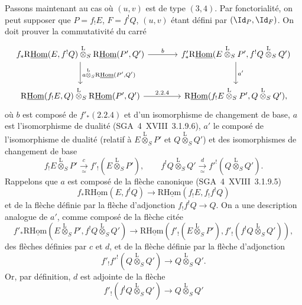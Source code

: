 Passons maintenant au cas où $(u,v)$ est de type $(3,4)$. Par fonctorialité, on peut supposer que $P=f_{!}E$, $F=f^{!}Q$, $(u,v)$ étant défini par $(\Id_P,\Id_F)$. On doit prouver la commutativité du carré
\[
\begin{tikzcd}[
column sep=large,row sep=large]
f_*\mathrm{R}\underline{\mathrm{Hom}}(E,f^!Q)\overset{\mathrm{L}}{\otimes}_S\mathrm{R}\underline{\mathrm{Hom}}(P',Q') \arrow[r,"b"] \arrow[d,"{a\overset{\mathrm{L}}{\otimes}_S\mathrm{R}\underline{\mathrm{Hom}}(P',Q')}"] & f'_*\mathrm{R}\underline{\mathrm{Hom}}(E\overset{\mathrm{L}}{\otimes}_SP',f^!Q\overset{\mathrm{L}}{\otimes}_SQ') \arrow[d,"a'"]\\
\mathrm{R}\underline{\mathrm{Hom}}(f_!E,Q)\overset{\mathrm{L}}{\otimes}_S\mathrm{R}\underline{\mathrm{Hom}}(P',Q') \arrow[r,"2.2.4"] & \mathrm{R}\underline{\mathrm{Hom}}(f_!E\overset{\mathrm{L}}{\otimes}_SP',Q\overset{\mathrm{L}}{\otimes}_SQ'),
\end{tikzcd}
\]
où $b$ est composé de $f'_*(2.2.4)$ et d'un isomorphisme de changement de base, $a$ est l'isomorphisme de dualité (SGA~4~XVIII~3.1.9.6), $a'$ le composé de l'isomorphisme de dualité (relatif à $E\overset{\mathrm{L}}{\otimes}_SP'$ et $Q\overset{\mathrm{L}}{\otimes}_SQ'$) et des isomorphismes de changement de base
\[
f_!E\overset{\mathrm{L}}{\otimes}_SP'\xrightarrow[\simeq]{c}f'_!(E\overset{\mathrm{L}}{\otimes}_SP'),
\qquad
f^!Q\overset{\mathrm{L}}{\otimes}_SQ'\xrightarrow[\simeq]{d}f'^!(Q\overset{\mathrm{L}}{\otimes}_SQ').
\]
Rappelons que $a$ est composé de la flèche canonique (SGA~4~XVIII~3.1.9.5)
\[
f_*\mathrm{R}\underline{\mathrm{Hom}}(E,f^!Q)\longrightarrow\mathrm{R}\underline{\mathrm{Hom}}(f_!E,f_!f^!Q)
\]
et de la flèche définie par la flèche d'adjonction $f_!f^!Q\to Q$. On a une description analogue de $a'$, comme composé de la flèche citée
\begin{equation}\tag{*}
f'_*\mathrm{R}\underline{\mathrm{Hom}}(E\overset{\mathrm{L}}{\otimes}_SP',f^!Q\overset{\mathrm{L}}{\otimes}_SQ')\longrightarrow
\mathrm{R}\underline{\mathrm{Hom}}(f'_!(E\overset{\mathrm{L}}{\otimes}_SP'),f'_!(f^!Q\overset{\mathrm{L}}{\otimes}_SQ')),
\end{equation}
des flèches définies par $c$ et $d$, et de la flèche définie par la flèche d'adjonction
\[
f'_!f'^!(Q\overset{\mathrm{L}}{\otimes}_SQ')\longrightarrow Q\overset{\mathrm{L}}{\otimes}_SQ'.
\]
Or, par définition, $d$ est adjointe de la flèche
\[
f'_!(f^!Q\overset{\mathrm{L}}{\otimes}_SQ')\longrightarrow Q\overset{\mathrm{L}}{\otimes}_SQ'
\]
